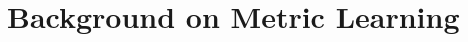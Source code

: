 \documentclass[twoside,11pt]{article}
\newcommand{\aurelien}[1]{\todo[inline,caption={},color=orange!40]{{\it Aurelien:~}#1}}
\begin{document}

\section{Background on Metric Learning} \label{metriclearning}






\end{document}
